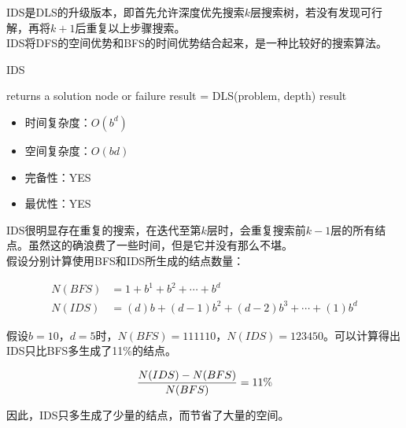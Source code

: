 IDS是DLS的升级版本，即首先允许深度优先搜索$ k $层搜索树，若没有发现可行解，再将$ k + 1 $后重复以上步骤搜索。\\

IDS将DFS的空间优势和BFS的时间优势结合起来，是一种比较好的搜索算法。\\

\begin{algorithm}[H]
    \caption{IDS}
    \begin{algorithmic}[1]
         returns a solution node or failure
        \State result = DLS(problem, depth)
        \State \Return result
        \EndIf
        \EndFor
        \EndProcedure
    \end{algorithmic}
\end{algorithm}

\begin{itemize}
    \item 时间复杂度：$ O(b^d) $
    \item 空间复杂度：$ O(bd) $
    \item 完备性：YES
    \item 最优性：YES
\end{itemize}

\vspace{0.5cm}

IDS很明显存在重复的搜索，在迭代至第$ k $层时，会重复搜索前$ k - 1 $层的所有结点。虽然这的确浪费了一些时间，但是它并没有那么不堪。\\

假设分别计算使用BFS和IDS所生成的结点数量：

\vspace{-1cm}

\begin{align*}
    N(BFS) & = 1 + b^1 + b^2 + \cdots + b^d                    \\
    N(IDS) & = (d)b +  (d - 1)b^2 + (d-2)b^3 + \cdots + (1)b^d
\end{align*}

假设$ b = 10 $，$ d = 5 $时，$ N(BFS) = 111110 $，$ N(IDS) = 123450 $。可以计算得出IDS只比BFS多生成了11\%的结点。

\vspace{-1cm}

\begin{align*}
    {{N(IDS) - N(BFS)} \over {N(BFS)}} = 11\%
\end{align*}

因此，IDS只多生成了少量的结点，而节省了大量的空间。\\

